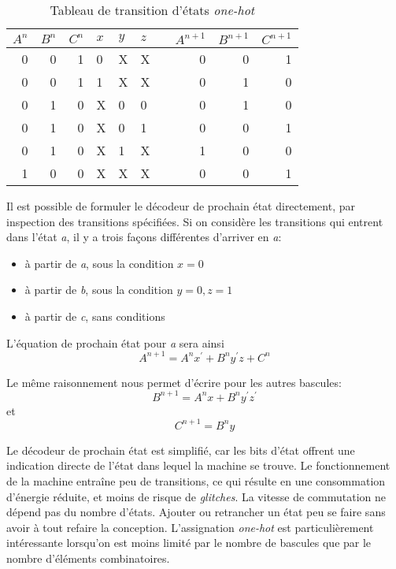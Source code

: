 \documentclass[11pt]{article}
\begin{document}
\begin{table}[htbp]
\caption{\label{tab:org3c83865}Tableau de transition d'états \emph{one-hot}}
\centering
\begin{tabular}{rrrllllrrr}
\(A^n\) & \(B^n\) & \(C^n\) & \(x\) & \(y\) & \(z\) &  & \(A^{n+1}\) & \(B^{n+1}\) & \(C^{n+1}\)\\
\hline
0 & 0 & 1 & 0 & X & X &  & 0 & 0 & 1\\
0 & 0 & 1 & 1 & X & X &  & 0 & 1 & 0\\
0 & 1 & 0 & X & 0 & 0 &  & 0 & 1 & 0\\
0 & 1 & 0 & X & 0 & 1 &  & 0 & 0 & 1\\
0 & 1 & 0 & X & 1 & X &  & 1 & 0 & 0\\
1 & 0 & 0 & X & X & X &  & 0 & 0 & 1\\
\end{tabular}
\end{table}

Il est possible de formuler le décodeur de prochain état directement,
par inspection des transitions spécifiées.  Si on considère les
transitions qui entrent dans l'état \emph{a}, il y a trois façons différentes
d'arriver en \emph{a}:
\begin{itemize}
\item à partir de \emph{a}, sous la condition \(x=0\)
\item à partir de \emph{b}, sous la condition \(y=0, z=1\)
\item à partir de \emph{c}, sans conditions
\end{itemize}

L'équation de prochain état pour \emph{a} sera ainsi 
$$
A^{n+1} = A^{n}x^\prime + B^n y^\prime z + C^n
$$

Le même raisonnement nous permet d'écrire pour les autres bascules:
$$
B^{n+1} = A^{n}x + B^n y^\prime z^\prime
$$
et 
$$
C^{n+1} = B^n y
$$

Le décodeur de prochain état est simplifié, car les bits d'état
offrent une indication directe de l'état dans lequel la machine se
trouve. Le fonctionnement de la machine entraîne peu de transitions,
ce qui résulte en une consommation d'énergie réduite, et moins de
risque de \emph{glitches}. La vitesse de commutation ne dépend pas du
nombre d'états. Ajouter ou retrancher un état peu se faire sans avoir
à tout refaire la conception.  L'assignation \emph{one-hot} est
particulièrement intéressante lorsqu'on est moins limité par le nombre
de bascules que par le nombre d'éléments combinatoires. 
\end{document}
